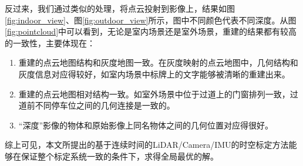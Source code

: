反过来，我们通过类似的处理，将点云投射到影像上，结果如图\ref{fig:indoor_view}、图\ref{fig:outdoor_view}所示，图中不同颜色代表不同深度。从图\ref{fig:pointcloud}中可以看到，无论是室内场景还是室外场景，重建的结果都有较高的一致性，主要体现在：
\begin{enumerate}
  \item 重建的点云地图结构和灰度地图一致。在灰度映射的点云地图中，几何结构和灰度信息对应得较好，如室内场景中标牌上的文字能够被清晰的重建出来。

  \item 重建的点云地图相对结构一致。如室外场景中位于过道上的门窗排列一致，过道前不同停车位之间的几何连接是一致的。

  \item “深度”影像的物体和原始影像上同名物体之间的几何位置对应得很好。
\end{enumerate}

综上可见，本文所提出的基于连续时间的LiDAR/Camera/IMU的时空标定方法能够在保证整个标定系统一致的条件下，求得全局最优的解。


